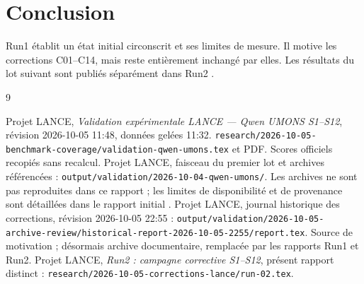 \documentclass[11pt,a4paper]{article}
\newcommand{\code}[1]{{\urlstyle{tt}\nolinkurl{#1}}}
\begin{document}
\section{Conclusion}
Run1 établit un état initial circonscrit et ses limites de mesure. Il motive les corrections C01–C14, mais reste entièrement inchangé par elles. Les résultats du lot suivant sont publiés séparément dans Run2 \cite{run2}.
\begin{thebibliography}{9}
 Projet LANCE, \emph{Validation expérimentale LANCE — Qwen UMONS S1–S12}, révision 2026-10-05 11:48, données gelées 11:32. \code{research/2026-10-05-benchmark-coverage/validation-qwen-umons.tex} et PDF. Scores officiels recopiés sans recalcul.
 Projet LANCE, faisceau du premier lot et archives référencées : \code{output/validation/2026-10-04-qwen-umons/}. Les archives ne sont pas reproduites dans ce rapport ; les limites de disponibilité et de provenance sont détaillées dans le rapport initial \cite{base}.
 Projet LANCE, journal historique des corrections, révision 2026-10-05 22:55 : \code{output/validation/2026-10-05-archive-review/historical-report-2026-10-05-2255/report.tex}. Source de motivation ; désormais archive documentaire, remplacée par les rapports Run1 et Run2.
 Projet LANCE, \emph{Run2 : campagne corrective S1–S12}, présent rapport distinct : \code{research/2026-10-05-corrections-lance/run-02.tex}.
\end{thebibliography}
\end{document}
